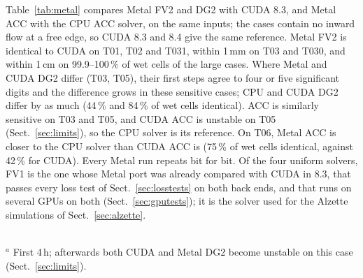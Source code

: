 \documentclass[preprint,12pt,authoryear]{elsarticle}
\begin{document}
Table~\ref{tab:metal} compares Metal FV2 and DG2 with CUDA 8.3, and Metal ACC
with the CPU ACC solver, on the same inputs; the cases contain no inward
flow at a free edge, so CUDA 8.3 and 8.4 give the same reference. Metal FV2
is identical to CUDA on T01, T02 and T031, within 1\,mm on T03 and T030, and
within 1\,cm on 99.9--100\,\% of wet cells of the large cases. Where Metal and CUDA DG2 differ (T03, T05), their first steps agree to
four or five significant digits and the difference grows in these sensitive
cases; CPU and CUDA DG2 differ by as much (44\,\% and 84\,\% of wet cells
identical). ACC is similarly sensitive on T03 and T05, and CUDA ACC is
unstable on T05 (Sect.~\ref{sec:limits}), so the CPU solver is its reference.
On T06, Metal ACC is closer to the CPU solver than CUDA ACC is (75\,\% of
wet cells identical, against 42\,\% for CUDA). Every Metal run repeats bit
for bit. Of the four uniform solvers, FV1 is the one whose Metal port was
already compared with CUDA in 8.3, that passes every loss test of
Sect.~\ref{sec:losstests} on both back ends, and that runs on several GPUs on
both (Sect.~\ref{sec:gputests}); it is the solver used for the Alzette
simulations of Sect.~\ref{sec:alzette}.

\begin{table}[t]
\caption{Metal against the reference over all outputs after the first: share
of wet cells ($>$1\,mm) that are identical, share within 1\,cm, and largest
difference. Reference: CUDA 8.3 for FV2 and DG2, CPU 8.3 for ACC.}
\label{tab:metal}
\centering\small
{}
\\[2pt]{\footnotesize $^{a}$ First 4\,h; afterwards both CUDA and Metal DG2
become unstable on this case (Sect.~\ref{sec:limits}).}
\end{table}
\end{document}
